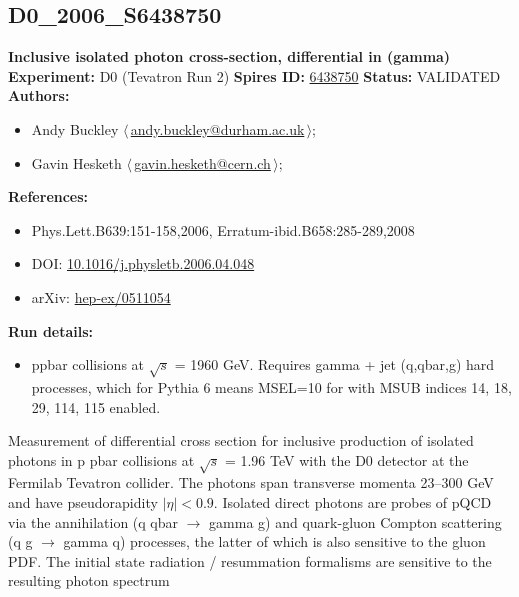 \subsection[D0\_2006\_S6438750]{D0\_2006\_S6438750\,\cite{Abazov:2005wc}}
\textbf{Inclusive isolated photon cross-section, differential in \pT(gamma)}\newline
\textbf{Experiment:} D0 (Tevatron Run 2) \newline
\textbf{Spires ID:} \href{http://www.slac.stanford.edu/spires/find/hep/www?rawcmd=key+6438750}{6438750}\newline
\textbf{Status:} VALIDATED\newline
\textbf{Authors:}
\begin{itemize}
  \item Andy Buckley $\langle\,$\href{mailto:andy.buckley@durham.ac.uk}{andy.buckley@durham.ac.uk}$\,\rangle$;
  \item Gavin Hesketh $\langle\,$\href{mailto:gavin.hesketh@cern.ch}{gavin.hesketh@cern.ch}$\,\rangle$;
\end{itemize}
\textbf{References:}
\begin{itemize}
  \item Phys.Lett.B639:151-158,2006, Erratum-ibid.B658:285-289,2008
  \item DOI: \href{http://dx.doi.org/10.1016/j.physletb.2006.04.048}{10.1016/j.physletb.2006.04.048}
  \item arXiv: \href{http://arxiv.org/abs/hep-ex/0511054}{hep-ex/0511054}
\end{itemize}
\textbf{Run details:}
\begin{itemize}

  \item ppbar collisions at \ensuremath{\sqrt{s}} = 1960 GeV. Requires gamma + jet (q,qbar,g)  hard processes, which for Pythia 6 means MSEL=10 for with MSUB indices  14, 18, 29, 114, 115 enabled.\end{itemize}

\noindent Measurement of differential cross section for inclusive production of isolated photons in p pbar collisions at \ensuremath{\sqrt{s}} = 1.96 TeV with the D0 detector at the Fermilab Tevatron collider. The photons span transverse momenta 23--300 GeV and have pseudorapidity $|\eta| < 0.9$. Isolated direct photons are probes of pQCD via the annihilation (q qbar \ensuremath{\to} gamma g) and quark-gluon Compton scattering (q g \ensuremath{\to} gamma q) processes, the latter of which is also sensitive to the gluon PDF. The initial state radiation / resummation formalisms are sensitive to the resulting photon \pT spectrum

